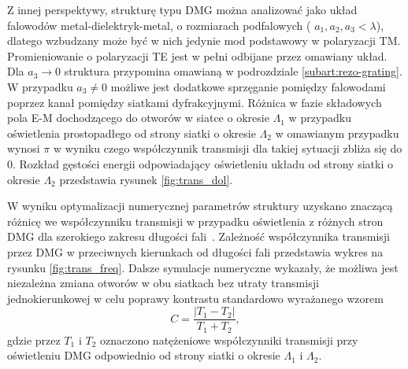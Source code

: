  Z innej perspektywy, strukturę typu DMG można analizować jako układ falowodów metal-dielektryk-metal, o rozmiarach podfalowych ( $a_1,a_2,a_3 < \lambda$), dlatego wzbudzany może być w nich jedynie mod podstawowy w polaryzacji TM. Promieniowanie o polaryzacji TE jest w pełni odbijane przez omawiany układ. Dla $a_3 \to 0$ struktura przypomina omawianą w podrozdziale \ref{subart:rezo-grating}. W przypadku $a_3 \ne 0$ możliwe jest dodatkowe sprzęganie pomiędzy falowodami poprzez kanał pomiędzy siatkami dyfrakcyjnymi. Różnica w fazie składowych pola E-M dochodzącego do otworów w siatce o okresie $\Lambda_1$ w przypadku oświetlenia prostopadłego od strony siatki o okresie $\Lambda_2$ w omawianym przypadku wynosi $\pi$ w wyniku czego współczynnik transmisji dla takiej sytuacji zbliża się do 0. Rozkład gęstości energii odpowiadający oświetleniu układu od strony siatki o okresie $\Lambda_2$ przedstawia rysunek \ref{fig:trans_dol}.

W wyniku optymalizacji numerycznej parametrów struktury uzyskano znaczącą różnicę we współczynniku transmisji w przypadku oświetlenia z różnych stron DMG dla szerokiego zakresu długości fali~\cite{Stolarek:13}. Zależność współczynnika transmisji przez DMG w przeciwnych kierunkach od długości fali przedstawia wykres na rysunku \ref{fig:trans_freq}. Dalsze symulacje numeryczne wykazały, że możliwa jest niezależna zmiana otworów w obu siatkach bez utraty transmisji jednokierunkowej w celu poprawy kontrastu standardowo wyrażanego wzorem
\begin{equation}
C=\frac{|T_1 - T_2|}{T_1+T_2},
\label{eq:contrast}
\end{equation}
gdzie przez $T_1$ i $T_2$ oznaczono natężeniowe współczynniki transmisji przy oświetleniu DMG odpowiednio od strony siatki o okresie $\Lambda_1$ i $\Lambda_2$.

